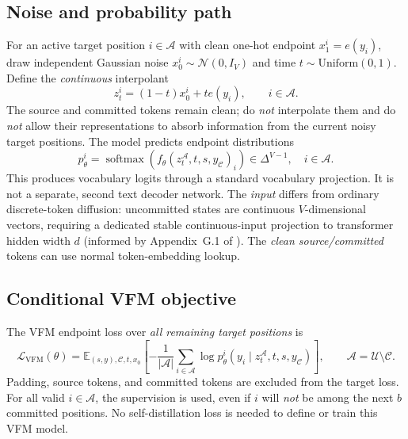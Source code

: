\documentclass[11pt,a4paper]{article}
\newcommand{\C}{\mathcal C}
\newcommand{\A}{\mathcal A}
\newcommand{\E}{\mathbb E}
\newcommand{\N}{\mathcal N}
\newcommand{\softmax}{\operatorname{softmax}}
\begin{document}
\subsection{Noise and probability path}
For an active target position $i\in\A$ with clean one-hot endpoint $x_1^i=e(y_i)$, draw independent Gaussian noise $x_0^i\sim\N(0,I_V)$ and time $t\sim\mathrm{Uniform}(0,1)$. Define the \emph{continuous} interpolant
\begin{equation}
\boxed{z_t^i=(1-t)x_0^i+t e(y_i),\qquad i\in\A.}\label{eq:interpolant}
\end{equation}
The source and committed tokens remain clean; do \emph{not} interpolate them and do \emph{not} allow their representations to absorb information from the current noisy target positions. The model predicts endpoint distributions
\begin{equation}
\boxed{p_\theta^i=\softmax\!\left(f_\theta(z_t^{\A},t,s,y_{\C})_i\right)\in\Delta^{V-1},\quad i\in\A.}\label{eq:endpoint}
\end{equation}
This produces vocabulary logits through a standard vocabulary projection. It is not a separate, second text decoder network. The \emph{input} differs from ordinary discrete-token diffusion: uncommitted states are continuous $V$-dimensional vectors, requiring a dedicated stable continuous-input projection to transformer hidden width $d$ (informed by Appendix~G.1 of \cite{roos2026}). The \emph{clean source/committed} tokens can use normal token-embedding lookup.

\subsection{Conditional VFM objective}
The VFM endpoint loss over \emph{all remaining target positions} is
\begin{equation}
\boxed{
\mathcal L_{\mathrm{VFM}}(\theta)=
\E_{(s,y),\C,t,x_0}\left[-\frac{1}{|\A|}\sum_{i\in\A}
\log p_\theta^i\left(y_i\mid z_t^{\A},t,s,y_{\C}\right)\right],
\qquad \A=\mathcal U\setminus\C.}
\label{eq:loss}
\end{equation}
Padding, source tokens, and committed tokens are excluded from the target loss. For all valid $i\in\A$, the supervision is used, even if $i$ will \emph{not} be among the next $b$ committed positions. No self-distillation loss is needed to define or train this VFM model.
\end{document}
